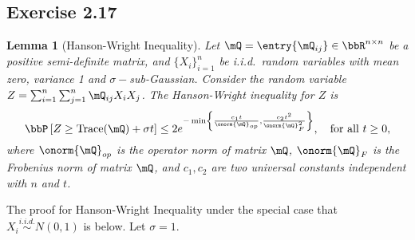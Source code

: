 \documentclass[11pt]{article}
\DeclareMathOperator{\tr}{Trace}
\newcommand{\off}[1]{\left[#1\right]}
\newcommand{\offf}[1]{\left\{#1\right\}}
\theoremstyle{plain}
\newtheorem{lem}{Lemma}
\theoremstyle{definition}
\begin{document}
    \subsection{Exercise 2.17}
    \begin{lem}[Hanson-Wright Inequality]
   Let $\mQ = \entry{\mQ_{ij}}  \in \bbR^{n \times n} $ be a positive semi-definite matrix, and $\{X_i\}_{i = 1}^n$ be i.i.d.\ random variables with mean zero, variance 1 and $\sigma-$sub-Gaussian. Consider the random variable $Z = \sum_{i= 1}^n \sum_{j = 1}^n \mQ_{ij} X_i X_j$. The Hanson-Wright inequality for $Z$ is
   \begin{equation}
   	\bbP \off{Z \geq \tr (\mQ) + \sigma t } \leq 2 e^{- \min \offf{\frac{c_1 t}{\onorm{\mQ}_{op}  } , \frac{c_2 t^2}{\onorm{\mQ}^2_F} }}, \quad \text{for all } t \geq 0,
   \end{equation}
   where $\onorm{\mQ}_{op}$ is the operator norm of matrix $\mQ$, $\onorm{\mQ}_F$ is the Frobenius norm of matrix $\mQ$, and $c_1,c_2$ are two universal constants independent with $n$ and $t$.
    \end{lem}
    
    The proof for Hanson-Wright Inequality under the special case that $X_i \stackrel{i.i.d.}{\sim} N(0,1)$ is below. Let $\sigma  = 1$.
    
\end{document}

